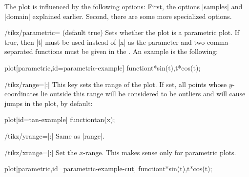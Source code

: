 The plot is influenced by the following options: First, the options |samples|
and |domain| explained earlier. Second, there are some more specialized
options.

\begin{key}{/tikz/parametric= (default true)}
    Sets whether the plot is a parametric plot. If true, then |t| must be used
    instead of |x| as the parameter and two comma-separated functions must be
    given in the . An example is the following:
\begin{codeexample}[]
\tikz \draw[scale=0.5,domain=-3.141:3.141,smooth]
  plot[parametric,id=parametric-example] function{t*sin(t),t*cos(t)};
\end{codeexample}
\end{key}

\begin{key}{/tikz/range=|:|}
    This key sets the range of the plot. If set, all points whose
    $y$-coordinates lie outside this range will be considered to be outliers
    and will cause jumps in the plot, by default:
\begin{codeexample}[]
\tikz \draw[scale=0.5,domain=-3.141:3.141, samples=100, smooth, range=-3:3]
  plot[id=tan-example] function{tan(x)};
\end{codeexample}
\end{key}

\begin{key}{/tikz/yrange=|:|}
    Same as |range|.
\end{key}

\begin{key}{/tikz/xrange=|:|}
    Set the $x$-range. This makes sense only for parametric plots.
\begin{codeexample}[]
\tikz \draw[scale=0.5,domain=-3.141:3.141,smooth,xrange=0:1]
  plot[parametric,id=parametric-example-cut] function{t*sin(t),t*cos(t)};
\end{codeexample}
\end{key}


